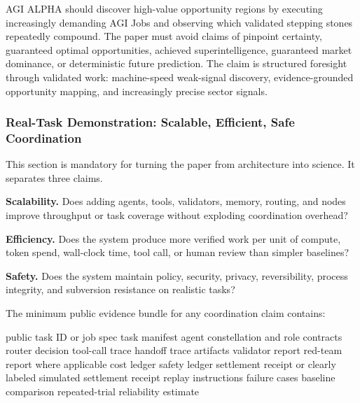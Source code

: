\documentclass[
  11pt,
]{article}
\newenvironment{Shaded}{}{}
\newcommand{\NormalTok}[1]{#1}
\begin{document}
AGI ALPHA should discover high-value opportunity regions by executing
increasingly demanding AGI Jobs and observing which validated stepping
stones repeatedly compound. The paper must avoid claims of pinpoint
certainty, guaranteed optimal opportunities, achieved superintelligence,
guaranteed market dominance, or deterministic future prediction. The
claim is structured foresight through validated work: machine-speed
weak-signal discovery, evidence-grounded opportunity mapping, and
increasingly precise sector signals.

\subsubsection{Real-Task Demonstration: Scalable, Efficient, Safe
Coordination}\label{real-task-demonstration-scalable-efficient-safe-coordination}

This section is mandatory for turning the paper from architecture into
science. It separates three claims.

\textbf{Scalability.} Does adding agents, tools, validators, memory,
routing, and nodes improve throughput or task coverage without exploding
coordination overhead?

\textbf{Efficiency.} Does the system produce more verified work per unit
of compute, token spend, wall-clock time, tool call, or human review
than simpler baselines?

\textbf{Safety.} Does the system maintain policy, security, privacy,
reversibility, process integrity, and subversion resistance on realistic
tasks?

The minimum public evidence bundle for any coordination claim contains:

\begin{Shaded}
\begin{Highlighting}[]
\NormalTok{public task ID or job spec}
\NormalTok{task manifest}
\NormalTok{agent constellation and role contracts}
\NormalTok{router decision}
\NormalTok{tool{-}call trace}
\NormalTok{handoff trace}
\NormalTok{artifacts}
\NormalTok{validator report}
\NormalTok{red{-}team report where applicable}
\NormalTok{cost ledger}
\NormalTok{safety ledger}
\NormalTok{settlement receipt or clearly labeled simulated settlement receipt}
\NormalTok{replay instructions}
\NormalTok{failure cases}
\NormalTok{baseline comparison}
\NormalTok{repeated{-}trial reliability estimate}
\end{Highlighting}
\end{Shaded}
\end{document}
